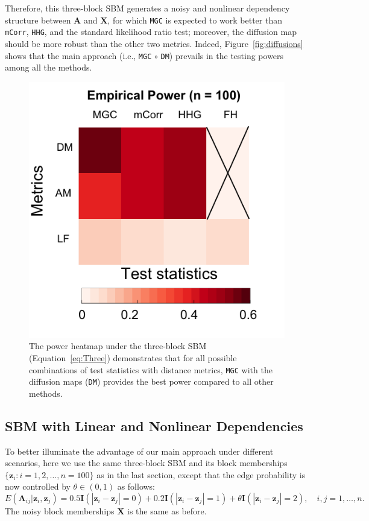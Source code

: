 \documentclass[11pt]{article}
\theoremstyle{definition}
\begin{document}
Therefore, this three-block SBM generates a noisy and nonlinear dependency structure between $\mathbf{A}$ and $\mathbf{X}$, for which \texttt{MGC} is expected to work better than \texttt{mCorr}, \texttt{HHG}, and the standard likelihood ratio test; moreover, the diffusion map should be more robust than the other two metrics. Indeed, Figure~\ref{fig:diffusions} shows that the main approach (i.e., \texttt{MGC} $\circ$ \texttt{DM}) prevails in the testing powers among all the methods.

\begin{figure}
	\centering
	\includegraphics[width=0.4\paperwidth, height=0.4\paperwidth]{../Figure/ThreeSBM_Elbow3.png}
	\caption{The power heatmap under the three-block SBM (Equation~\ref{eq:Three}) demonstrates that for all possible combinations of test statistics with distance metrics, \texttt{MGC} with the diffusion maps (\texttt{DM}) provides the best power compared to all other methods.}
	\label{fig:threeSBM}
\end{figure}

\subsection{SBM with Linear and Nonlinear Dependencies}
To better illuminate the advantage of our main approach under different scenarios, here we use the same three-block SBM and its block memberships $\{ \mathbf{z}_{i} : i=1,2, \ldots, n=100 \}$ as in the last section, except that the edge probability is now controlled by $\theta \in (0, 1)$ as follows:
\begin{equation}
E(\mathbf{A}_{ij} | \mathbf{z}_{i}, \mathbf{z}_{j}) = 0.5 \mathbf{I}(|\mathbf{z}_{i} - \mathbf{z}_{j}| = 0) + 0.2 \mathbf{I}(|\mathbf{z}_{i} - \mathbf{z}_{j}| = 1) + \theta \mathbf{I}(|\mathbf{z}_{i} - \mathbf{z}_{j}| = 2), \quad i,j = 1, \ldots, n.
\label{eq:mono}
\end{equation}
The noisy block memberships $\mathbf{X}$ is the same as before.
\end{document}
